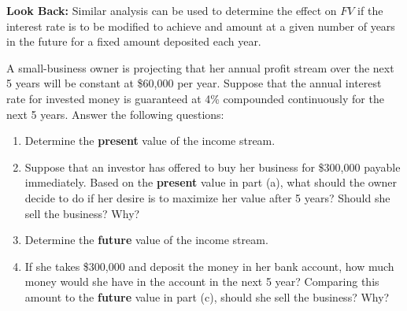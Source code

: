 \noindent \textbf{Look Back:} Similar analysis can  be used to determine the effect on $FV$ if the interest rate is to be modified to achieve and amount at a given number of years in the future for a fixed amount deposited each year.
\newpage

\begin{example}
A small-business owner is projecting that her annual profit stream over the next 5 years will be constant at \$60,000 per year.  Suppose that the annual interest rate for invested money is guaranteed at 4\% compounded continuously for the next 5 years. Answer the following questions:
\renewcommand{\labelenumi}{\textbf{(\alph{enumi})}}
    \begin{enumerate}[leftmargin=*]
    \item Determine the \textbf{present} value of the income stream. 
    \item Suppose that an investor has offered to buy her business for \$300,000 payable immediately.  Based on the \textbf{present} value in part (a),   what should the owner decide to do if her desire is to maximize her value after 5 years? Should she sell the business? Why?
    \item Determine the \textbf{future} value of the income stream. \newpage
    \item If she takes \$300,000 and deposit the money in her bank account, how much money would she have in the account in the next 5 year? Comparing this amount to  the \textbf{future} value in part (c), should she sell the business? Why?
    \end{enumerate}
    

\end{example}
